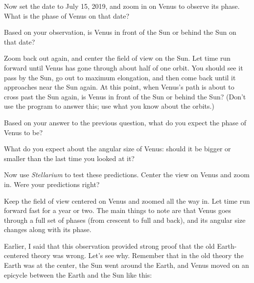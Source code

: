 \answerspace{ 0.7in}

\pagebreak[2]
Now set the date to July 15, 2019, and 
zoom in on Venus to observe its phase.  What is the phase of Venus on that date?

\answerspace{ 0.7in}

Based on your observation, is Venus in front of the Sun or behind the Sun
on that date?

\answerspace{ 0.7in}


Zoom back out again, and center the field of view on the Sun.  Let time
run forward until Venus has gone through about half of one orbit.  You
should see it pass by the Sun, go out to maximum elongation, and then come
back until it approaches near the Sun again.  At this point, when
Venus's path is about to cross past the Sun again, is Venus in front
of the Sun or behind the Sun?  (Don't use the program to answer this; 
use what you know about the orbits.)

\answerspace{ 0.7in}

Based on your answer to the previous question, what do you expect the 
phase of Venus to be?

\answerspace{ 0.7in}

What do you expect about the angular size of Venus: should it be bigger
or smaller than the last time you looked at it?

\answerspace{ 0.7in}

Now use \textit{Stellarium} to
test these predictions.
Center the view on Venus and zoom in.
Were your predictions right?

\answerspace{ 0.7in}

\pagebreak[2]
Keep the field of view centered on Venus and zoomed all the way in.  Let time
run forward fast for a year or two.  The main things to note are that
Venus goes through a full set of phases (from crescent to full and back),
and its angular size changes along with its phase.

Earlier, I said that this observation provided strong proof that
the old Earth-centered theory was wrong.  Let's see why.  Remember that
in the old theory the Earth was at the center, the Sun went around the
Earth, and Venus moved on an epicycle between the Earth and the Sun like this:

